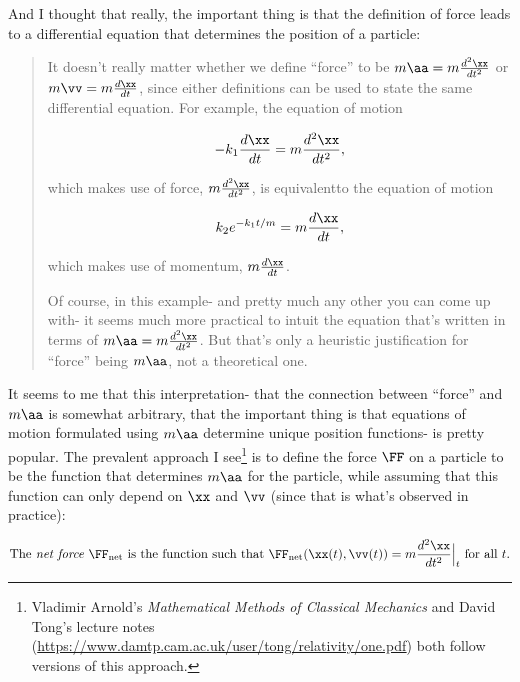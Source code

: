 \documentclass{article}
\begin{document}
And I thought that really, the important thing is that the definition of force leads to a differential equation that determines the position of a particle:

\begin{quote}
    It doesn't really matter whether we define ``force'' to be $m\aa = m\frac{d^2\xx}{dt^2}$ or $m\vv = m \frac{d\xx}{dt}$, since either definitions can be used to state the same differential equation. For example, the equation of motion

    \begin{align*}
        -k_1 \frac{d\xx}{dt} = m\frac{d^2\xx}{dt^2},
    \end{align*}

    which makes use of force, $m \frac{d^2\xx}{dt^2}$, is equivalent\footnotemark to the equation of motion

    \begin{align*}
        k_2 e^{-k_1 t/m} = m\frac{d\xx}{dt},
    \end{align*}

    which makes use of momentum, $m \frac{d\xx}{dt}$.

    Of course, in this example- and pretty much any other you can come up with- it seems much more practical to intuit the equation that's written in terms of $m \aa = m \frac{d^2\xx}{dt^2}$. But that's only a heuristic justification for ``force'' being $m\aa$, not a theoretical one.
\end{quote}


It seems to me that this interpretation- that the connection between ``force'' and $m\aa$ is somewhat arbitrary, that the important thing is that equations of motion formulated using $m\aa$ determine unique position functions- is pretty popular. The prevalent approach I see\footnote{Vladimir Arnold's \textit{Mathematical Methods of Classical Mechanics} and David Tong's lecture notes (\url{https://www.damtp.cam.ac.uk/user/tong/relativity/one.pdf}) both follow versions of this approach.} is to define the force  $\FF$ on a particle to be the function that determines $m\aa$ for the particle, while assuming that this function can only depend on $\xx$ and $\vv$ (since that is what's observed in practice):

\begin{align*}
    \text{The \textit{net force} $\FF_{\text{net}}$ is the function such that } \FF_{\text{net}}(\xx(t), \vv(t)) = m \frac{d^2\xx}{dt^2}\Big|_t \text{ for all $t$}.
\end{align*}
\end{document}
